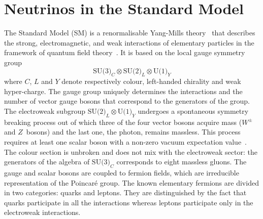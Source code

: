 
\clearpage
\chapter{Neutrinos in the Standard Model}
\label{cha:intro}

The Standard Model (SM) is a renormalisable Yang-Mills theory~\cite{Yang:1954ek} that describes the strong, %
electromagnetic, and weak interactions of elementary particles in the framework of quantum field %
theory~\cite{Glashow:1961tr, Weinberg:1967tq, Salam:1968rm}.
It is based on the local gauge symmetry group 
\begin{equation}
	\label{eq:smgroup}
	\text{SU(3)}_C \otimes \text{SU(2)}_L \otimes \text{U(1)}_Y
\end{equation}
where $C$, $L$ and $Y$ denote respectively colour, left-handed chirality and weak hyper-charge.
The gauge group uniquely determines the interactions and the number of %
vector gauge bosons that correspond to the generators of the group.
%
The electroweak subgroup $\text{SU(2)}_L \otimes \text{U(1)}_Y$ undergoes a spontaneous symmetry breaking process %
out of which three of the four vector bosons acquire mass ($W^\pm$ and $Z$~bosons) and the last one, the photon, remains massless.
This process requires at least one scalar boson with a non-zero vacuum expectation value~\cite{Higgs:1964pj, Higgs:1964ia}.
The colour section is unbroken and does not mix with the electroweak sector: %
the generators of the algebra of $\text{SU(3)}_C$ corresponds to eight massless gluons.
%
The gauge and scalar bosons are coupled to fermion fields, which are irreducible representation of %
the Poincaré group.
The known elementary fermions are divided in two categories: quarks and leptons.
They are distinguished by the fact that quarks participate in all the interactions %
whereas leptons participate only in the electroweak interactions.
